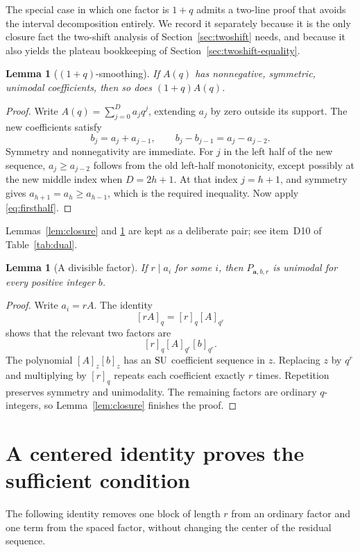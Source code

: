 \documentclass[11pt]{article}
\theoremstyle{research}
\newtheorem{lemma}[theorem]{Lemma}
\theoremstyle{definition}
\newcommand{\qi}[1]{[#1]_q}
\newcommand{\qir}[2]{[#1]_{q^{#2}}}
\newcommand{\SU}{\textup{SU}}
\numberwithin{equation}{section}
\begin{document}
The special case in which one factor is $1+q$ admits a two-line proof that
avoids the interval decomposition entirely. We record it separately because
it is the only closure fact the two-shift analysis of
Section~\ref{sec:twoshift} needs, and because it also yields the plateau
bookkeeping of Section~\ref{sec:twoshift-equality}.

\begin{lemma}[$(1+q)$-smoothing]\label{lem:smoothing}
If $A(q)$ has nonnegative, symmetric, unimodal coefficients, then so does
$(1+q)A(q)$.
\end{lemma}
\begin{proof}
Write $A(q)=\sum_{j=0}^{D}a_jq^j$, extending $a_j$ by zero outside its
support. The new coefficients satisfy
\begin{equation}\label{eq:smoothing-difference}
 b_j=a_j+a_{j-1},\qquad b_j-b_{j-1}=a_j-a_{j-2}.
\end{equation}
Symmetry and nonnegativity are immediate. For $j$ in the left half of the
new sequence, $a_j\ge a_{j-2}$ follows from the old left-half monotonicity,
except possibly at the new middle index when $D=2h+1$. At that index
$j=h+1$, and symmetry gives $a_{h+1}=a_h\ge a_{h-1}$, which is the required
inequality. Now apply \eqref{eq:firsthalf}.
\end{proof}

Lemmas~\ref{lem:closure} and \ref{lem:smoothing} are kept as a deliberate
pair; see item~D10 of Table~\ref{tab:dual}.

\begin{lemma}[A divisible factor]\label{lem:divisible}
If $r\mid a_i$ for some $i$, then $P_{\boldsymbol a,b,r}$ is unimodal for
every positive integer $b$.
\end{lemma}
\begin{proof}
Write $a_i=rA$. The identity
\[
 \qi{rA}=\qi r\qir A r
\]
shows that the relevant two factors are
\[
 \qi r\qir A r\qir b r.
\]
The polynomial $[A]_z[b]_z$ has an $\SU$ coefficient sequence in $z$.
Replacing $z$ by $q^r$ and multiplying by $\qi r$ repeats each coefficient
exactly $r$ times. Repetition preserves symmetry and unimodality.
The remaining factors are ordinary $q$-integers, so
Lemma~\ref{lem:closure} finishes the proof.
\end{proof}

\section{A centered identity proves the sufficient condition}
\label{sec:sufficiency}
The following identity removes one block of length $r$ from an ordinary
factor and one term from the spaced factor, without changing the center
of the residual sequence.
\end{document}
